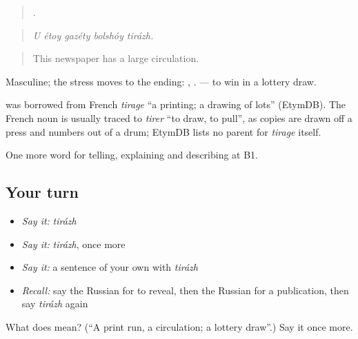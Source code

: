 \begin{quote}
    .
\end{quote}

\begin{quote}
\emph{U étoy gazéty bolshóy tirázh.}
\end{quote}

\begin{quote}
This newspaper has a large circulation.
\end{quote}

Masculine; the stress moves to the ending: \emph{}, \emph{}. \emph{  } — to win in a lottery draw.

\begin{cousinweb}
\emph{} was borrowed from French \emph{tirage} \textquotedblleft{}a printing; a drawing of lots\textquotedblright{} (EtymDB). The French noun is usually traced to \emph{tirer} \textquotedblleft{}to draw, to pull\textquotedblright{}, as copies are drawn off a press and numbers out of a drum; EtymDB lists no parent for \emph{tirage} itself.
\end{cousinweb}

\begin{grammarlens}[title={What you've built}]
One more word for telling, explaining and describing at B1.
\end{grammarlens}

\subsection*{Your turn}
\begin{itemize}
\raggedright
  \item \emph{Say it:} \emph{tirázh}
  \item \emph{Say it:} \emph{tirázh}, once more
  \item \emph{Say it:} a sentence of your own with \emph{tirázh}
  \item \emph{Recall:} say the Russian for to reveal, then the Russian for a publication, then say \emph{tirázh} again
\end{itemize}

\begin{tcolorbox}[breakable,colback=teal!4,colframe=teal!35!black,title={Before you move on}]
What does  mean? (\textquotedblleft{}A print run, a circulation; a lottery draw\textquotedblright{}.) Say it once more.
\end{tcolorbox}
